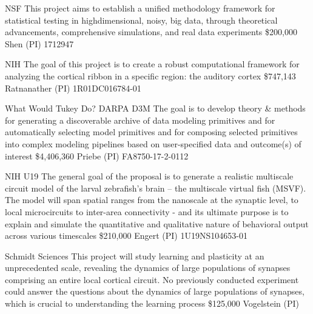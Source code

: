 \documentclass[10pt,colorlinks=true,urlcolor=blue]{moderncv}
\begin{document}
%
    {NSF}%
    {This project aims to establish a unified methodology framework for statistical testing in highdimensional, noisy, big data, through theoretical advancements, comprehensive simulations, and real data experiments}%
    {\$200,000}%
    {Shen (PI) 1712947}{}


%
    {NIH}%
    {The goal of this project is to create a robust computational framework for analyzing the cortical ribbon in a specific region: the auditory cortex}%
    {\$747,143}
    {Ratnanather (PI) 1R01DC016784-01}{}


%
    {What Would Tukey Do?}%
    {DARPA D3M}%
    {The goal is to develop theory \& methods for generating a discoverable archive of data modeling primitives and for automatically selecting model primitives and for composing selected primitives into complex modeling pipelines based on user-specified data and outcome(s) of interest}%
    {\$4,406,360}%
    {Priebe (PI) FA8750-17-2-0112}{}


%
    {NIH U19}%
    {The general goal of the proposal is to generate a realistic multiscale circuit model of the larval zebrafish’s brain – the multiscale virtual fish (MSVF). The model will span spatial ranges from the nanoscale at the synaptic level, to local microcircuits to inter-area connectivity - and its ultimate purpose is to explain and simulate the quantitative and qualitative nature of behavioral output across various timescales}%
    {\$210,000}%
    {Engert (PI) 1U19NS104653-01}{}


%
    {Schmidt Sciences}%
    {This project will study learning and plasticity at an unprecedented scale, revealing the dynamics of large populations of synapses comprising an entire local cortical circuit. No previously conducted experiment could answer the questions about the dynamics of large populations of synapses, which is crucial to understanding the learning process}%
    {\$125,000}%
    {Vogelstein (PI)}{}
\end{document}
